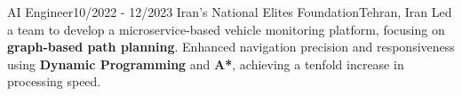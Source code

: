 \resumeSubheadingReza
{AI Engineer}{10/2022 - 12/2023}
{Iran's National Elites Foundation}{Tehran, Iran}
{Led a team to develop a microservice-based vehicle monitoring platform, focusing on \textbf{graph-based path planning}. Enhanced navigation precision and responsiveness using \textbf{Dynamic Programming} and \textbf{A*}, achieving a tenfold increase in processing speed.}